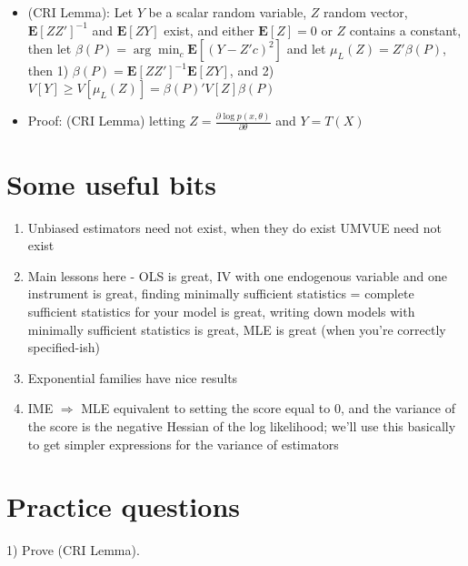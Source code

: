 \documentclass[12pt,english]{article}
\begin{document}
\begin{itemize}
\begin{itemize}
\begin{itemize}
			\begin{itemize}
				\item (CRI Lemma): Let $Y$ be a scalar random variable, $Z$ random vector, $\mathbf{E}[Z Z']^{-1}$ and $\mathbf{E}[ZY]$ exist, and either $\mathbf{E}[Z] = 0$ or $Z$ contains a constant, then let $\beta(P) = \arg \min_{c} \mathbf{E}[\left(Y - Z'c\right)^{2}]$ and let $\mu_{L}(Z) = Z'\beta(P)$, then 1) $\beta(P) = \mathbf{E}[ZZ']^{-1} \mathbf{E}[ZY]$, and 2) $V[Y] \geq V[\mu_{L}(Z)] = \beta(P)'V[Z] \beta(P)$
				\item Proof: (CRI Lemma) letting $Z = \frac{\partial \log p(x, \theta)}{\partial \theta}$ and $Y = T(X)$
			\end{itemize}
		\end{itemize}
	\end{itemize}
\end{itemize}

\section{Some useful bits}
\begin{enumerate}
	\item Unbiased estimators need not exist, when they do exist UMVUE need not exist
	\item Main lessons here - OLS is great, IV with one endogenous variable and one instrument is great, finding minimally sufficient statistics = complete sufficient statistics for your model is great, writing down models with minimally sufficient statistics is great, MLE is great (when you're correctly specified-ish)
	\item Exponential families have nice results
	\item IME $\Rightarrow$ MLE equivalent to setting the score equal to 0, and the variance of the score is the negative Hessian of the log likelihood; we'll use this basically to get simpler expressions for the variance of estimators
\end{enumerate}

\section{Practice questions}

1) Prove (CRI Lemma).
\end{document}

